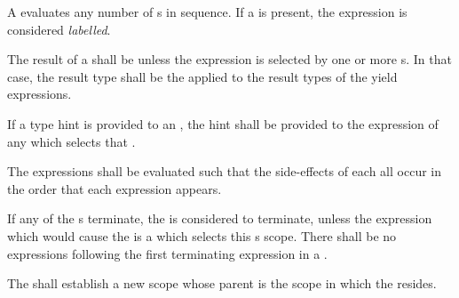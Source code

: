 \specsubsubitem
A  evaluates any number of
s in sequence. If a  is present, the
expression is considered \textit{labelled}.

\specsubsubitem
The result of a  shall be 
unless the expression is selected by one or more
s. In that case, the result type shall be the
 applied to the result types of the
yield expressions.

\specsubsubitem
If a type hint is provided to an , the hint shall
be provided to the expression of any  which
selects that .

\specsubsubitem
The expressions shall be evaluated such that the side-effects of each all occur
in the order that each expression appears.

\specsubsubitem
If any of the s terminate, the
 is considered to terminate, unless the
expression which would cause the  is a
 which selects this
s scope. There shall be no expressions
following the first terminating expression in a .

\specsubsubitem
The  shall establish a new scope whose parent is
the scope in which the  resides.


\begin{grammar}
 \\
	  \\
	  \\
	  \\
	 \\

 \\
	 \\
	  \\
	  \\
	  \terminal{,}  \\
\end{grammar}

